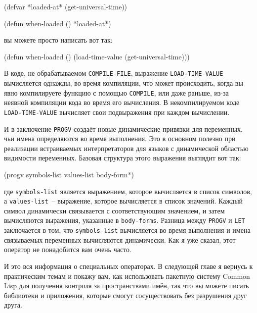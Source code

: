 \begin{myverb}
(defvar *loaded-at* (get-universal-time))

(defun when-loaded () *loaded-at*)
\end{myverb}

\noindent{}вы можете просто написать вот так:

\begin{myverb}
(defun when-loaded () (load-time-value (get-universal-time)))
\end{myverb}

В коде, не обрабатываемом \lstinline{COMPILE-FILE}, выражение \lstinline{LOAD-TIME-VALUE}
вычисляется однажды, во время компиляции, что может происходить, когда вы явно компилируете
функцию с помощью \lstinline{COMPILE}, или даже раньше, из-за неявной компиляции кода во время
его вычисления.  В некомпилируемом коде \lstinline{LOAD-TIME-VALUE} вычисляет свои
подвыражения при каждом вычислении.

И в заключение \lstinline{PROGV} создаёт новые динамические привязки для переменных, чьи имена
определяются во время выполнения.  Это в основном полезно при реализации встраиваемых
интерпретаторов для языков с динамической областью видимости переменных.  Базовая
структура этого выражения выглядит вот так:

\begin{myverb}
(progv symbols-list values-list
  body-form*)
\end{myverb}

\noindent{}где \lstinline{symbols-list} является выражением, которое вычисляется в список символов, а
\lstinline{values-list}~-- выражение, которое вычисляется в список значений.  Каждый символ
динамически связывается с соответствующим значением, и затем вычисляются выражения,
указанные в \lstinline{body-forms}.  Разница между \lstinline{PROGV} и \lstinline{LET} заключается в том,
что \lstinline{symbols-list} вычисляется во время выполнения и имена связываемых переменных
вычисляются динамически.  Как я уже сказал, этот оператор не понадобится вам очень часто.

И это вся информация о специальных операторах.  В следующей главе я вернусь к
практическим темам и покажу вам, как использовать пакетную систему Common Lisp для
получения контроля за пространствами имён, так что вы можете писать библиотеки и
приложения, которые смогут сосуществовать без разрушения друг друга.

